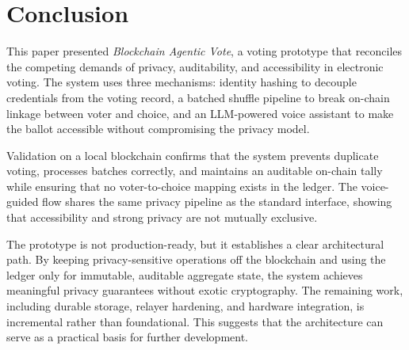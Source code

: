 \documentclass{ieeeaccess}
\begin{document}
\section{Conclusion}
This paper presented \emph{Blockchain Agentic Vote}, a voting prototype that reconciles the competing demands of privacy, auditability, and accessibility in electronic voting. The system uses three mechanisms: identity hashing to decouple credentials from the voting record, a batched shuffle pipeline to break on-chain linkage between voter and choice, and an LLM-powered voice assistant to make the ballot accessible without compromising the privacy model.

Validation on a local blockchain confirms that the system prevents duplicate voting, processes batches correctly, and maintains an auditable on-chain tally while ensuring that no voter-to-choice mapping exists in the ledger. The voice-guided flow shares the same privacy pipeline as the standard interface, showing that accessibility and strong privacy are not mutually exclusive.

The prototype is not production-ready, but it establishes a clear architectural path. By keeping privacy-sensitive operations off the blockchain and using the ledger only for immutable, auditable aggregate state, the system achieves meaningful privacy guarantees without exotic cryptography. The remaining work, including durable storage, relayer hardening, and hardware integration, is incremental rather than foundational. This suggests that the architecture can serve as a practical basis for further development.
\end{document}

